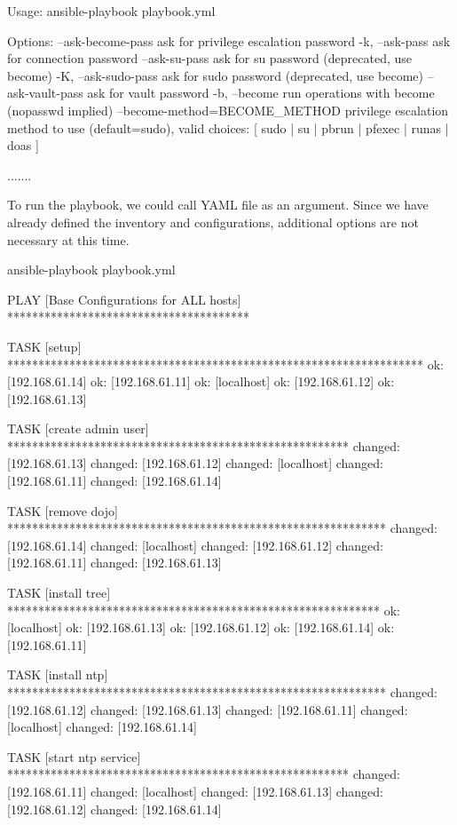 \begin{code}
[output]

Usage: ansible-playbook playbook.yml

Options:
  --ask-become-pass     ask for privilege escalation password
  -k, --ask-pass        ask for connection password
  --ask-su-pass         ask for su password (deprecated, use become)
  -K, --ask-sudo-pass   ask for sudo password (deprecated, use become)
  --ask-vault-pass      ask for vault password
  -b, --become          run operations with become (nopasswd implied)
  --become-method=BECOME_METHOD
                        privilege escalation method to use (default=sudo),
                        valid choices: [ sudo | su | pbrun | pfexec | runas |
                        doas ]

.......
\end{code}

To run the playbook, we could call YAML file as an argument. Since we have already defined the inventory and configurations, additional options are not necessary at this time.

\begin{code}
ansible-playbook playbook.yml
\end{code}

\begin{code}
[output]

PLAY [Base Configurations for ALL hosts] ***************************************

TASK [setup] *******************************************************************
ok: [192.168.61.14]
ok: [192.168.61.11]
ok: [localhost]
ok: [192.168.61.12]
ok: [192.168.61.13]

TASK [create admin user] *******************************************************
changed: [192.168.61.13]
changed: [192.168.61.12]
changed: [localhost]
changed: [192.168.61.11]
changed: [192.168.61.14]

TASK [remove dojo] *************************************************************
changed: [192.168.61.14]
changed: [localhost]
changed: [192.168.61.12]
changed: [192.168.61.11]
changed: [192.168.61.13]

TASK [install tree] ************************************************************
ok: [localhost]
ok: [192.168.61.13]
ok: [192.168.61.12]
ok: [192.168.61.14]
ok: [192.168.61.11]

TASK [install ntp] *************************************************************
changed: [192.168.61.12]
changed: [192.168.61.13]
changed: [192.168.61.11]
changed: [localhost]
changed: [192.168.61.14]

TASK [start ntp service] *******************************************************
changed: [192.168.61.11]
changed: [localhost]
changed: [192.168.61.13]
changed: [192.168.61.12]
changed: [192.168.61.14]
\end{code}


